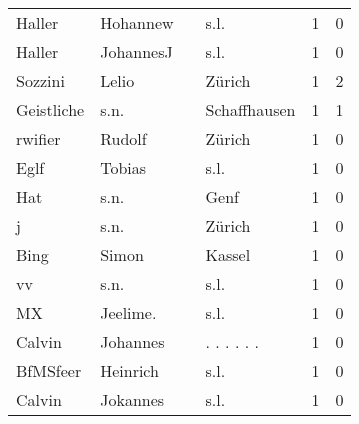 \begin{tabular}{llllrr}
                   Haller &                           Hohannew &             &                                        s.l. &          1 &         0 \\
                   Haller &                          JohannesJ &             &                                        s.l. &          1 &         0 \\
                  Sozzini &                              Lelio &             &                                      Zürich &          1 &         2 \\
               Geistliche &                               s.n. &             &                                Schaffhausen &          1 &         1 \\
                  rwifier &                             Rudolf &             &                                      Zürich &          1 &         0 \\
                     Eglf &                             Tobias &             &                                        s.l. &          1 &         0 \\
                      Hat &                               s.n. &             &                                        Genf &          1 &         0 \\
                        j &                               s.n. &             &                                      Zürich &          1 &         0 \\
                     Bing &                              Simon &             &                                      Kassel &          1 &         0 \\
                       vv &                               s.n. &             &                                        s.l. &          1 &         0 \\
                       MX &                           Jeelime. &             &                                        s.l. &          1 &         0 \\
                   Calvin &                           Johannes &             &                                . . . . . .  &          1 &         0 \\
                 BfMSfeer &                           Heinrich &             &                                        s.l. &          1 &         0 \\
                   Calvin &                           Jokannes &             &                                        s.l. &          1 &         0 \\

\end{tabular}

